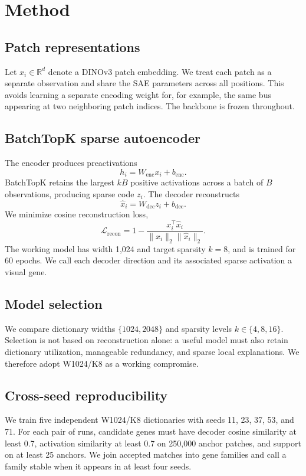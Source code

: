 \documentclass[10pt]{article}
\begin{document}
\section{Method}
\subsection{Patch representations}
Let $x_i\in\mathbb{R}^d$ denote a DINOv3 patch embedding. We treat each patch as a
separate observation and share the SAE parameters across all positions. This avoids
learning a separate encoding weight for, for example, the same bus appearing at two
neighboring patch indices. The backbone is frozen throughout.

\subsection{BatchTopK sparse autoencoder}
The encoder produces preactivations
\begin{equation}
  h_i = W_{\mathrm{enc}}x_i+b_{\mathrm{enc}}.
\end{equation}
BatchTopK retains the largest $kB$ positive activations across a batch of $B$
observations, producing sparse code $z_i$. The decoder reconstructs
\begin{equation}
  \hat{x}_i=W_{\mathrm{dec}}z_i+b_{\mathrm{dec}}.
\end{equation}
We minimize cosine reconstruction loss,
\begin{equation}
  \mathcal{L}_{\mathrm{recon}} = 1-\frac{x_i^\top\hat{x}_i}
  {\lVert x_i\rVert_2\lVert\hat{x}_i\rVert_2}.
\end{equation}
The working model has width 1,024 and target sparsity $k=8$, and is trained for 60
epochs. We call each decoder direction and its associated sparse activation a visual
gene.

\subsection{Model selection}
We compare dictionary widths $\{1024,2048\}$ and sparsity levels
$k\in\{4,8,16\}$. Selection is not based on reconstruction alone: a useful model
must also retain dictionary utilization, manageable redundancy, and sparse local
explanations. We therefore adopt W1024/K8 as a working compromise.

\subsection{Cross-seed reproducibility}
We train five independent W1024/K8 dictionaries with seeds 11, 23, 37, 53, and 71.
For each pair of runs, candidate genes must have decoder cosine similarity at least
0.7, activation similarity at least 0.7 on 250,000 anchor patches, and support on at
least 25 anchors. We join accepted matches into gene families and call a family
stable when it appears in at least four seeds.
\end{document}
